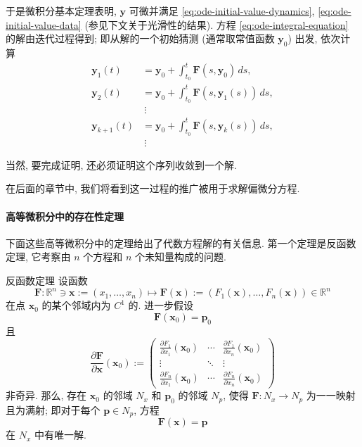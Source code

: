 于是微积分基本定理表明, $\mathbf{y}$ 可微并满足 \eqref{eq:ode-initial-value-dynamics}, \eqref{eq:ode-initial-value-data} (参见下文关于光滑性的结果). 方程 \eqref{eq:ode-integral-equation} 的解由迭代过程得到; 即从解的一个初始猜测 (通常取常值函数 $\mathbf{y}_0$) 出发, 依次计算
\begin{equation}\label{eq:picard-iteration}
\begin{aligned}
\mathbf{y}_1(t)&=\mathbf{y}_0+\textstyle\int_{t_0}^t\mathbf{F}(s,\mathbf{y}_0)\,ds,\\
\mathbf{y}_2(t)&=\mathbf{y}_0+\textstyle\int_{t_0}^t\mathbf{F}(s,\mathbf{y}_1(s))\,ds,\\
&\ \vdots\\
\mathbf{y}_{k+1}(t)&=\mathbf{y}_0+\textstyle\int_{t_0}^t\mathbf{F}(s,\mathbf{y}_k(s))\,ds,\\
&\ \vdots
\end{aligned}
\end{equation}

当然, 要完成证明, 还必须证明这个序列收敛到一个解.

在后面的章节中, 我们将看到这一过程的推广被用于求解偏微分方程.

\paragraph*{高等微积分中的存在性定理}

下面这些高等微积分中的定理给出了代数方程解的有关信息. 第一个定理是反函数定理, 它考察由 $n$ 个方程和 $n$ 个未知量构成的问题.

\begin{Theorem}{反函数定理}
\label{thm:inverse-function}
设函数
\[
\mathbf{F}:\mathbb{R}^n\ni\mathbf{x}:=(x_1,\ldots,x_n)\mapsto\mathbf{F}(\mathbf{x}):=(F_1(\mathbf{x}),\ldots,F_n(\mathbf{x}))\in\mathbb{R}^n
\]
在点 $\mathbf{x}_0$ 的某个邻域内为 $C^1$ 的. 进一步假设
\[
\mathbf{F}(\mathbf{x}_0)=\mathbf{p}_0
\]
且
\[
\frac{\partial\mathbf{F}}{\partial\mathbf{x}}(\mathbf{x}_0):=
\begin{pmatrix}
\frac{\partial F_1}{\partial x_1}(\mathbf{x}_0)&\cdots&\frac{\partial F_1}{\partial x_n}(\mathbf{x}_0)\\
\vdots&\ddots&\vdots\\
\frac{\partial F_n}{\partial x_1}(\mathbf{x}_0)&\cdots&\frac{\partial F_n}{\partial x_n}(\mathbf{x}_0)
\end{pmatrix}
\]
非奇异. 那么, 存在 $\mathbf{x}_0$ 的邻域 $N_x$ 和 $\mathbf{p}_0$ 的邻域 $N_p$, 使得 $\mathbf{F}:N_x\to N_p$ 为一一映射且为满射; 即对于每个 $\mathbf{p}\in N_p$, 方程
\[
\mathbf{F}(\mathbf{x})=\mathbf{p}
\]
在 $N_x$ 中有唯一解.
\end{Theorem}


